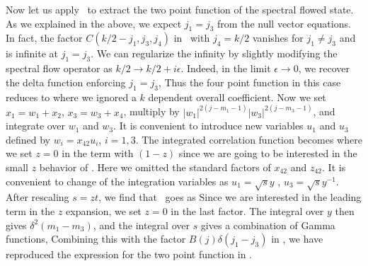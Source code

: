 Now let us apply \ to extract the two point function
of the spectral flowed state. As we explained in the above,
we expect $j_1 = j_3$ from the null vector equations.
In fact, the factor $C(k/2-j_1, j_3, j_4)$ in \fourpt\
with $j_4=k/2$ vanishes for $j_1\neq j_3$ and is infinite
at $j_1=j_3$. We can regularize the infinity by slightly
modifying the spectral flow operator as
$k/2 \rightarrow k/2 + i \epsilon$. Indeed, in the limit
$\epsilon \rightarrow 0$, we recover the
delta function enforcing $j_1=j_3$,
\eqn{}
Thus the four point function in this case reduces to
\eqn{}
where we ignored a $k$ dependent overall coefficient.
Now we set $x_1 = w_1 + x_2$, $x_3= w_3 + x_4$, multiply
by $|w_1|^{2(j-m_1 -1)} |w_3|^{2(j-m_3-1)}$, and
integrate over $w_1$ and $w_3$.
It is convenient to introduce new variables $u_1$ and
$u_3$ defined by $w_i = x_{42} u_i$, $i=1,3$.
The integrated correlation function becomes
\eqn{}
where we set $z=0$ in the term with $(1-z)$ since we are going
to be interested in the small $z$ behavior of \fptfl . Here
we omitted the standard factors of $x_{42}$ and $z_{42}$.
It is convenient to change of the integration variables as
$u_1 = \sqrt{s} y$ , $u_3 = \sqrt{s}y^{-1}$.
After rescaling $s = z t $, we  find that \inte\ goes as
\eqn{}
Since we are interested in the leading term in the $z$ expansion,
we set $z=0$ in the last factor.
The integral over $y$ then gives $\delta^2(m_1-m_3)$, and
the integral over $s$ gives a  combination of
Gamma functions,
\eqn{}
Combining this with the factor $B(j)\delta(j_1-j_3)$ in
\fptfl , we have reproduced the expression
   for the two point function in \flowedx  .

